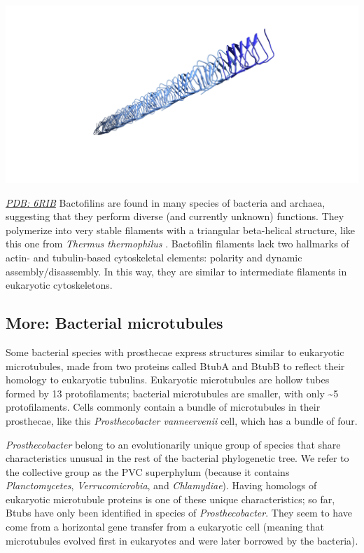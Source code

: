 \documentclass[]{tufte-book}
\begin{document}
\includegraphics{img/schematics/3_6_1}

\href{http://rcsb.org/structure/6RIB}{\emph{PDB: 6RIB}}
Bactofilins are found in many species of bacteria and archaea, suggesting that they perform diverse (and currently unknown) functions. They polymerize into very stable filaments with a triangular beta-helical structure, like this one from \emph{Thermus thermophilus} \citep{deng2019}. Bactofilin filaments lack two hallmarks of actin- and tubulin-based cytoskeletal elements: polarity and dynamic assembly/disassembly. In this way, they are similar to intermediate filaments in eukaryotic cytoskeletons.

\hypertarget{Bacterial_microtubules}{%
\subsection*{More: Bacterial microtubules}\label{Bacterial_microtubules}}

Some bacterial species with prosthecae express structures similar to eukaryotic microtubules, made from two proteins called BtubA and BtubB to reflect their homology to eukaryotic tubulins. Eukaryotic microtubules are hollow tubes formed by 13 protofilaments; bacterial microtubules are smaller, with only \textasciitilde{}5 protofilaments. Cells commonly contain a bundle of microtubules in their prosthecae, like this \emph{Prosthecobacter vanneervenii} cell, which has a bundle of four.

\emph{Prosthecobacter} belong to an evolutionarily unique group of species that share characteristics unusual in the rest of the bacterial phylogenetic tree. We refer to the collective group as the PVC superphylum (because it contains \emph{Planctomycetes}, \emph{Verrucomicrobia}, and \emph{Chlamydiae}). Having homologs of eukaryotic microtubule proteins is one of these unique characteristics; so far, Btubs have only been identified in species of \emph{Prosthecobacter}. They seem to have come from a horizontal gene transfer from a eukaryotic cell (meaning that microtubules evolved first in eukaryotes and were later borrowed by the bacteria).
\end{document}
